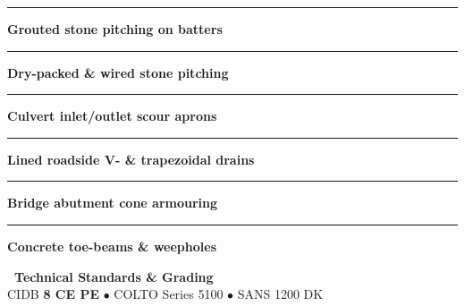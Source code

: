 \documentclass[a4paper,11pt]{article}
\providecommand{\faMountain}{\faLayerGroup}
\begin{document}
\begin{minipage}[t]{0.34\textwidth}
    \vspace{0pt}
    \begin{tcolorbox}[
        enhanced, colback=mhoffwhite, colframe=mhnavy, boxrule=0.9pt, arc=4pt,
        title={\bfseries\color{white}\faMountain\ Scope of Work},
        colbacktitle=mhnavy, left=7pt, right=7pt, top=5pt, bottom=5pt, drop shadow=black!5
    ]
        \fontsize{7.8pt}{10.8pt}\selectfont
        \textcolor{mhnavy}{\rule{3.5pt}{3.5pt}}\hspace{4pt}\textbf{Grouted stone pitching on batters}\\
        \textcolor{mhnavy}{\rule{3.5pt}{3.5pt}}\hspace{4pt}\textbf{Dry-packed \& wired stone pitching}\\
        \textcolor{mhnavy}{\rule{3.5pt}{3.5pt}}\hspace{4pt}\textbf{Culvert inlet/outlet scour aprons}\\
        \textcolor{mhnavy}{\rule{3.5pt}{3.5pt}}\hspace{4pt}\textbf{Lined roadside V- \& trapezoidal drains}\\
        \textcolor{mhnavy}{\rule{3.5pt}{3.5pt}}\hspace{4pt}\textbf{Bridge abutment cone armouring}\\
        \textcolor{mhnavy}{\rule{3.5pt}{3.5pt}}\hspace{4pt}\textbf{Concrete toe-beams \& weepholes}
    \end{tcolorbox}

    \vspace{0.12cm}

    \begin{tcolorbox}[
        enhanced, colback=white, colframe=mhlightgray, boxrule=0.8pt, arc=4pt,
        left=6pt, right=6pt, top=5pt, bottom=5pt, drop shadow=black!3
    ]
        {\fontsize{7.5pt}{9.6pt}\selectfont\bfseries\color{mhnavy}\faCheckDouble\ Technical Standards \& Grading}\\[2pt]
        {\fontsize{7.3pt}{9.4pt}\selectfont\color{mhtextmuted}
        CIDB \textbf{8 CE PE} $\bullet$ COLTO Series 5100 $\bullet$ SANS 1200 DK}
    \end{tcolorbox}
\end{minipage}

\vfill
\end{document}
